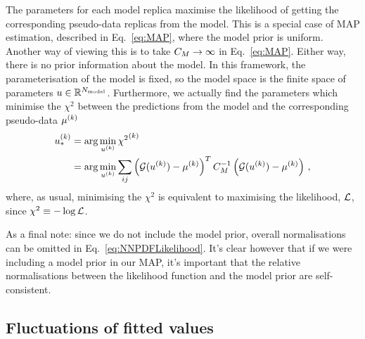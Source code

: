 The parameters for
each model replica maximise the likelihood of getting the corresponding
pseudo-data replicas from the model. This is a special case of MAP estimation,
described in Eq.~\eqref{eq:MAP}, where the model prior is uniform. Another way
of viewing this is to take $C_M \to \infty$ in Eq.~\eqref{eq:MAP}.
Either way, there is no prior information about the
model. In this framework, the parameterisation of the model is fixed, so the
model space is the finite space of parameters $u \in \mathbb{R}^{N_{\rm model}}$.
Furthermore, we actually find the
parameters which minimise the $\chi^2$ between the predictions from the model
and the corresponding pseudo-data $\mu^{(k)}$
\begin{equation}\label{eq:NNPDFLikelihood}
    \begin{split}
        u_*^{(k)} &= \arg\min_{u^{(k)}} {\chi^2}^{(k)} \\
        &= \arg\min_{u^{(k)}} \sum_{ij}
        \left( \mathcal{G}(u^{(k)}) - \mu^{(k)} \right)^T
        C_M^{-1}
        \left( \mathcal{G}(u^{(k)}) - \mu^{(k)} \right) \, ,
    \end{split}
\end{equation}
where, as usual,
minimising the $\chi^2$ is equivalent to maximising the likelihood,
$\mathcal{L}$, since $\chi^2 \equiv -\log{\mathcal{L}}$.

As a final note:
since we do not include the model prior, overall normalisations can be omitted
in Eq.~\ref{eq:NNPDFLikelihood}. It's clear however that if we were including
a model prior in our MAP, it's important that the relative normalisations between
the likelihood function and the model prior are self-consistent.

\subsection{Fluctuations of fitted values}
\label{sec:fluct-fit-values}

